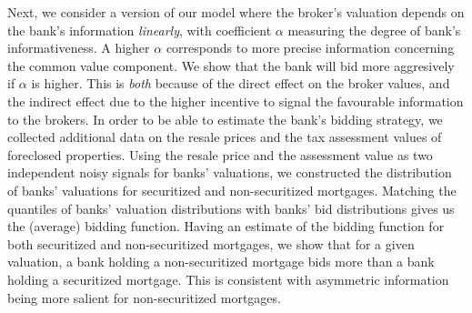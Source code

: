 \documentclass[11pt,twopage]{article}
\begin{document}
Next, we consider a version of our model where the broker's valuation depends on the bank's information  \emph{linearly}, with coefficient $\alpha$ measuring the degree of bank's informativeness. A higher $\alpha$ corresponds to more precise information concerning the common value component. We show that the bank will bid more aggresively if $\alpha$ is higher. This is \emph{both} because of the direct effect on the broker values, and the indirect effect due to the higher incentive to signal the favourable information to the brokers. 
%
In order to be able to estimate the bank's bidding strategy, we collected additional data on the resale prices and the tax assessment values of foreclosed properties. Using the resale price and the assessment value as two independent noisy signals for banks' valuations, we constructed the distribution of banks' valuations for securitized and non-securitized mortgages. Matching the quantiles of banks' valuation distributions with banks' bid distributions gives us the (average) bidding function. Having an estimate of the bidding function for both securitized and non-securitized mortgages, we show that for a given valuation, a bank holding a non-securitized mortgage bids more than a bank holding a securitized mortgage. This is consistent with asymmetric information being more salient for non-securitized mortgages.

\end{document}
